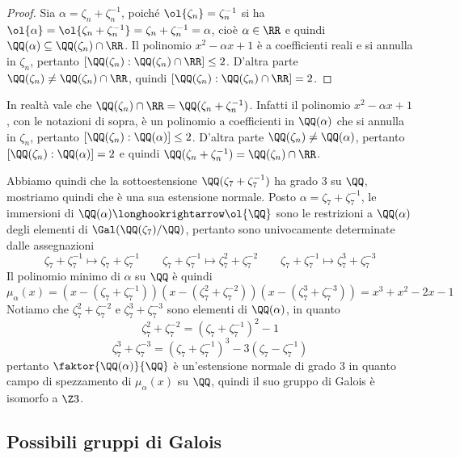 \documentclass[11pt]{scrartcl}
\begin{document}
\begin{proof}
    Sia $\alpha = \zeta_n + \zeta_n^{-1}$, poiché $\ol{\zeta_n} = \zeta_n^{-1}$
    si ha $\ol{\alpha} = \ol{\zeta_n + \zeta_n^{-1}} = \zeta_n + \zeta_n^{-1} = \alpha$,
    cioè $\alpha \in \RR$ e quindi $\QQ(\alpha) \subseteq \QQ(\zeta_n)\cap \RR$.
    Il polinomio $x^2 - \alpha x + 1$ è a coefficienti reali e si annulla in 
    $\zeta_n$, pertanto $[\QQ(\zeta_n):\QQ(\zeta_n)\cap \RR]\leq 2$. D'altra
    parte $\QQ(\zeta_n)\neq \QQ(\zeta_n)\cap \RR$, quindi 
    $[\QQ(\zeta_n):\QQ(\zeta_n)\cap \RR] = 2$.
\end{proof}

\begin{remark}
    In realtà vale che $\QQ(\zeta_n)\cap \RR = \QQ(\zeta_n + \zeta_n^{-1})$.
    Infatti il polinomio $x^2 - \alpha x + 1$, con le notazioni di sopra, 
    è un polinomio a coefficienti in $\QQ(\alpha)$ che si annulla in $\zeta_n$,
    pertanto $[\QQ(\zeta_n):\QQ(\alpha)] \leq 2$. D'altra parte $\QQ(\zeta_n)\neq \QQ(\alpha)$,
    pertanto $[\QQ(\zeta_n):\QQ(\alpha)] = 2$ e quindi 
    $\QQ(\zeta_n + \zeta_n^{-1}) = \QQ(\zeta_n)\cap \RR$.
\end{remark}

Abbiamo quindi che la sottoestensione $\QQ(\zeta_7 + \zeta_7^{-1})$ ha grado
3 su $\QQ$, mostriamo quindi che è una sua estensione normale. Posto 
$\alpha = \zeta_7 + \zeta_7^{-1}$, le immersioni di 
$\QQ(\alpha) \longhookrightarrow \ol{\QQ}$ sono le restrizioni a $\QQ(\alpha)$
degli elementi di $\Gal(\QQ(\zeta_7)/\QQ)$, pertanto sono univocamente determinate
dalle assegnazioni 
\[
    \zeta_7 + \zeta_7^{-1} \longmapsto \zeta_7 + \zeta_7^{-1}\qquad
    \zeta_7 + \zeta_7^{-1} \longmapsto \zeta_7^2 + \zeta_7^{-2}\qquad
    \zeta_7 + \zeta_7^{-1} \longmapsto \zeta_7^3 + \zeta_7^{-3}
\]
Il polinomio minimo di $\alpha$ su $\QQ$ è quindi 
\[
    \mu_{\alpha}(x) = (x - (\zeta_7 + \zeta_7^{-1}))(x - (\zeta_7^2 + \zeta_7^{-2}))(x - (\zeta_7^3 + \zeta_7^{-3}))
    = x^3 + x^2 - 2x - 1
\]
Notiamo che $\zeta_7^2 + \zeta_7^{-2}$ e $\zeta_7^3 + \zeta_7^{-3}$ sono
elementi di $\QQ(\alpha)$, in quanto
\[
    \zeta_7^2 + \zeta_7^{-2} = (\zeta_7 + \zeta_7^{-1})^2 - 1
\]
\[
    \zeta_7^3 + \zeta_7^{-3} = (\zeta_7 + \zeta_7^{-1})^3 - 3(\zeta_7 - \zeta_7^{-1})
\]
pertanto $\faktor{\QQ(\alpha)}{\QQ}$ è un'estensione normale di grado 3 in 
quanto campo di spezzamento di $\mu_{\alpha}(x)$ su $\QQ$,
quindi il suo gruppo di Galois è isomorfo a $\Z3$.

\newpage

\subsection{Possibili gruppi di Galois}
\end{document}
